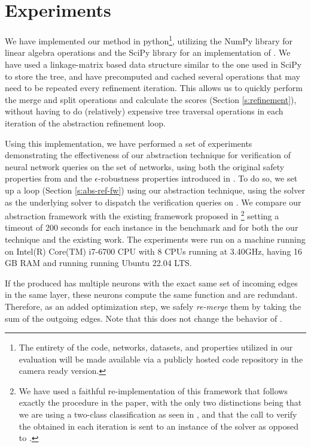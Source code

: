 \section{Experiments} 

We have implemented our method in python\footnote{The entirety of the code,
networks, datasets, and properties utilized in our evaluation will be made
available via a publicly hosted code repository in the camera ready version.}, 
utilizing the NumPy library for linear algebra
operations and the SciPy library for an implementation of \hcluster.
We have used a linkage-matrix based data structure similar to the one used in
SciPy to store the tree, and have precomputed and cached several
operations that may need to be repeated every refinement iteration. This allows
us to quickly perform the merge and split operations and calculate the
scores (Section \ref{s:refinement}), without having to do (relatively)
expensive tree traversal operations in each iteration of the abstraction
refinement loop. 

Using this implementation, we have performed a set of experiments demonstrating
the effectiveness of our abstraction technique for verification of neural
network queries on the \acasxu set of networks, using both the original safety
properties from \cite{reluplex} and the $\epsilon$-robustness properties
introduced in \cite{cegar-nn}. To do so, we set up a \cegar loop (Section
\ref{s:abs-ref-fw}) using our abstraction technique, using the \neuralsat solver
as the underlying solver to dispatch the verification queries on \abs.
We compare our abstraction framework with the existing \cegar framework proposed
in \cite{cegar-nn} \footnote{We have used a faithful re-implementation of this
framework that follows exactly the procedure in the paper, with the only two
distinctions being that we are using a two-class classification as seen in
\cite{chauhan2022efficiently,liu2022abstraction,10.1145/3644387},
and that the call to verify the \abs obtained in each iteration is sent to an
instance of the \neuralsat solver as opposed to \marabou. } 
setting a 
timeout of 200 seconds for each instance in the benchmark and for both the
our technique and the existing work.
The experiments were run on a machine running on Intel(R) Core(TM) 
i7-6700 CPU with 8 CPUs running at 3.40GHz, having 16 GB RAM and running running 
Ubuntu 22.04 LTS.

If the \abs produced has multiple neurons with the exact same set of incoming
edges in the same layer, these neurons compute the same function and are
redundant. Therefore, as an added optimization step, we safely \textit{re-merge}
them by taking the sum of the outgoing edges. Note that this does not change the
behavior of \abs.

